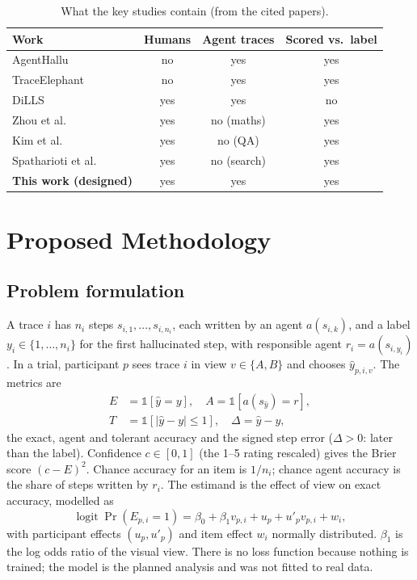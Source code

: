 \documentclass[conference]{IEEEtran}
\begin{document}
\begin{table}[t]
\centering\footnotesize
\caption{What the key studies contain (from the cited papers).}
\label{tab:matrix}
\begin{tabular}{@{}p{2.1cm}ccc@{}}
\toprule
Work & Humans & Agent traces & Scored vs.\ label\\
\midrule
AgentHallu \cite{liu2026agenthallu} & no & yes & yes\\
TraceElephant \cite{chen2026elephant} & no & yes & yes\\
DiLLS \cite{sheng2026dills} & yes & yes & no\\
Zhou et al.\ \cite{zhou2026verification} & yes & no (maths) & yes\\
Kim et al.\ \cite{kim2025reliance} & yes & no (QA) & yes\\
Spatharioti et al.\ \cite{spatharioti2025search} & yes & no (search) & yes\\
\textbf{This work (designed)} & yes & yes & yes\\
\bottomrule
\end{tabular}
\end{table}

\section{Proposed Methodology}\label{sec:method}
\subsection{Problem formulation}
A trace $i$ has $n_i$ steps $s_{i,1},\dots,s_{i,n_i}$, each written by an agent $a(s_{i,k})$, and a label $y_i \in \{1,\dots,n_i\}$ for the first hallucinated step, with responsible agent $r_i = a(s_{i,y_i})$. In a trial, participant $p$ sees trace $i$ in view $v \in \{A,B\}$ and chooses $\hat{y}_{p,i,v}$. The metrics are
\begin{align}
E &= \mathbb{1}[\hat y = y], \quad A = \mathbb{1}[a(s_{\hat y}) = r],\\
T &= \mathbb{1}[|\hat y - y|\le 1], \quad \Delta = \hat y - y,
\end{align}
the exact, agent and tolerant accuracy and the signed step error ($\Delta>0$: later than the label). Confidence $c\in[0,1]$ (the 1--5 rating rescaled) gives the Brier score $(c-E)^2$. Chance accuracy for an item is $1/n_i$; chance agent accuracy is the share of steps written by $r_i$. The estimand is the effect of view on exact accuracy, modelled as
\begin{equation}
\operatorname{logit}\Pr(E_{p,i}=1)=\beta_0+\beta_1 v_{p,i}+u_{p}+u'_{p}v_{p,i}+w_i,
\end{equation}
with participant effects $(u_p,u'_p)$ and item effect $w_i$ normally distributed. $\beta_1$ is the log odds ratio of the visual view. There is no loss function because nothing is trained; the model is the planned analysis and was not fitted to real data.
\end{document}
